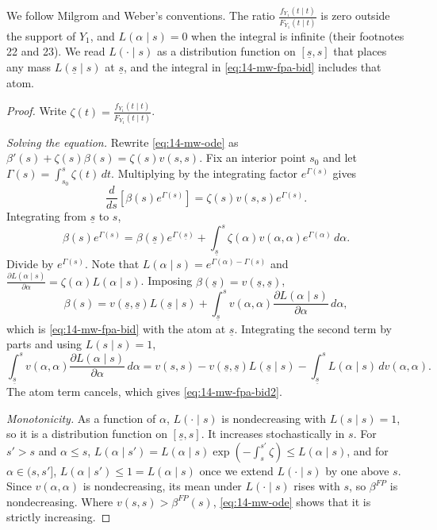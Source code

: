 We follow Milgrom and Weber's conventions. The ratio $\frac{f_{Y_1}(t\mid t)}{F_{Y_1}(t\mid t)}$ is zero
outside the support of $Y_1$, and $L(\alpha\mid s)=0$ when the integral is infinite (their footnotes 22 and
23). We read $L(\cdot\mid s)$ as a distribution function on $[\underline s,s]$ that places any mass
$L(\underline s\mid s)$ at $\underline s$, and the integral in \eqref{eq:14-mw-fpa-bid} includes that atom.

\begin{proof}
Write $\zeta(t)=\frac{f_{Y_1}(t\mid t)}{F_{Y_1}(t\mid t)}$.

\emph{Solving the equation.} Rewrite \eqref{eq:14-mw-ode} as $\beta'(s)+\zeta(s)\beta(s)=\zeta(s)v(s,s)$. Fix an
interior point $s_0$ and let $\Gamma(s)=\int_{s_0}^s\zeta(t)\,dt$. Multiplying by the integrating factor
$e^{\Gamma(s)}$ gives
\begin{equation*}
  \frac{d}{ds}\left[\beta(s)e^{\Gamma(s)}\right]=\zeta(s)v(s,s)e^{\Gamma(s)}.
\end{equation*}
Integrating from $\underline s$ to $s$,
\begin{equation*}
  \beta(s)e^{\Gamma(s)}=\beta(\underline s)e^{\Gamma(\underline s)}
  +\int_{\underline s}^s\zeta(\alpha)v(\alpha,\alpha)e^{\Gamma(\alpha)}\,d\alpha.
\end{equation*}
Divide by $e^{\Gamma(s)}$. Note that $L(\alpha\mid s)=e^{\Gamma(\alpha)-\Gamma(s)}$ and
$\frac{\partial L(\alpha\mid s)}{\partial\alpha}=\zeta(\alpha)L(\alpha\mid s)$. Imposing
$\beta(\underline s)=v(\underline s,\underline s)$,
\begin{equation*}
  \beta(s)=v(\underline s,\underline s)L(\underline s\mid s)
  +\int_{\underline s}^sv(\alpha,\alpha)\frac{\partial L(\alpha\mid s)}{\partial\alpha}\,d\alpha,
\end{equation*}
which is \eqref{eq:14-mw-fpa-bid} with the atom at $\underline s$. Integrating the second term by parts and
using $L(s\mid s)=1$,
\begin{equation*}
  \int_{\underline s}^sv(\alpha,\alpha)\frac{\partial L(\alpha\mid s)}{\partial\alpha}\,d\alpha
  =v(s,s)-v(\underline s,\underline s)L(\underline s\mid s)-\int_{\underline s}^sL(\alpha\mid s)\,dv(\alpha,\alpha).
\end{equation*}
The atom term cancels, which gives \eqref{eq:14-mw-fpa-bid2}.

\emph{Monotonicity.} As a function of $\alpha$, $L(\cdot\mid s)$ is nondecreasing with $L(s\mid s)=1$, so it is a
distribution function on $[\underline s,s]$. It increases stochastically in $s$. For $s'>s$ and $\alpha\le s$,
$L(\alpha\mid s')=L(\alpha\mid s)\exp(-\int_s^{s'}\zeta)\le L(\alpha\mid s)$, and for $\alpha\in(s,s']$,
$L(\alpha\mid s')\le1=L(\alpha\mid s)$ once we extend $L(\cdot\mid s)$ by one above $s$. Since
$v(\alpha,\alpha)$ is nondecreasing, its mean under $L(\cdot\mid s)$ rises with $s$, so $\beta^{FP}$ is
nondecreasing. Where $v(s,s)>\beta^{FP}(s)$, \eqref{eq:14-mw-ode} shows that it is strictly increasing.


\end{proof}
